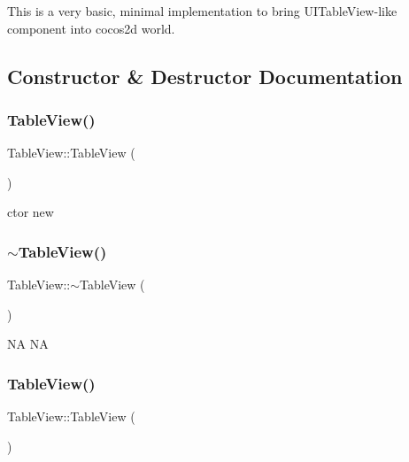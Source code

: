 This is a very basic, minimal implementation to bring U\+I\+Table\+View-\/like component into cocos2d world. 

\subsection{Constructor \& Destructor Documentation}
\mbox{\label{classTableView_a5af30a8dfb5cc01b5bd2db1ac59e91fd}} 
\subsubsection{\texorpdfstring{Table\+View()}{TableView()}\hspace{0.1cm}{\footnotesize\ttfamily [1/2]}}
{\footnotesize\ttfamily Table\+View\+::\+Table\+View (\begin{DoxyParamCaption}{ }\end{DoxyParamCaption})}

ctor  new \mbox{\label{classTableView_af8ce226b68febf945ee38531c5bd4c47}} 
\subsubsection{\texorpdfstring{$\sim$\+Table\+View()}{~TableView()}\hspace{0.1cm}{\footnotesize\ttfamily [1/2]}}
{\footnotesize\ttfamily Table\+View\+::$\sim$\+Table\+View (\begin{DoxyParamCaption}{ }\end{DoxyParamCaption})\hspace{0.3cm}{\ttfamily [virtual]}}

NA  NA \mbox{\label{classTableView_a5af30a8dfb5cc01b5bd2db1ac59e91fd}} 
\subsubsection{\texorpdfstring{Table\+View()}{TableView()}\hspace{0.1cm}{\footnotesize\ttfamily [2/2]}}
{\footnotesize\ttfamily Table\+View\+::\+Table\+View (\begin{DoxyParamCaption}{ }\end{DoxyParamCaption})}

